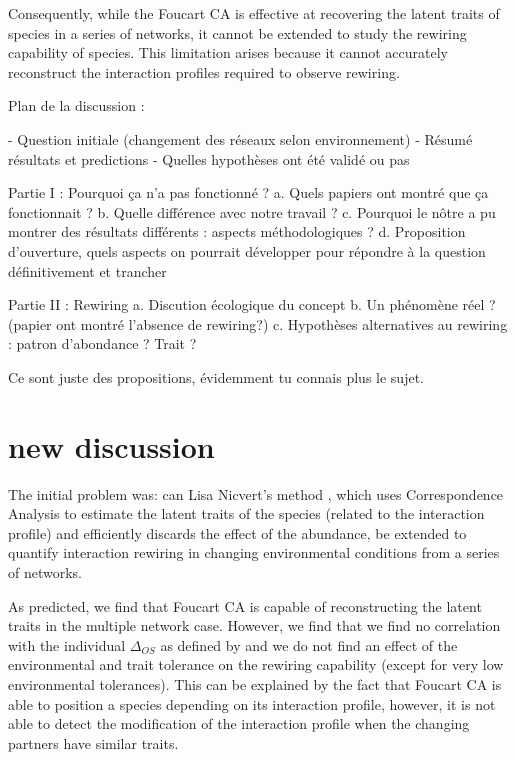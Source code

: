 Consequently, while the Foucart CA is effective at recovering the latent traits of species in a series of networks, it cannot be extended to study the rewiring capability of species. This limitation arises because it cannot accurately reconstruct the interaction profiles required to observe rewiring.






Plan de la discussion : 

- Question initiale (changement des réseaux selon environnement)
- Résumé résultats et predictions
- Quelles hypothèses ont été validé ou pas


Partie I : Pourquoi ça n'a pas fonctionné ?
a. Quels papiers ont montré que ça fonctionnait ?
b. Quelle différence avec notre travail ?
c. Pourquoi le nôtre a pu montrer des résultats différents : aspects méthodologiques ?
d. Proposition d'ouverture, quels aspects on pourrait développer pour répondre à la question définitivement et trancher

Partie II : Rewiring 
a. Discution écologique du concept
b. Un phénomène réel ? (papier ont montré l'absence de rewiring?)
c. Hypothèses alternatives au rewiring : patron d'abondance ? Trait ? 

Ce sont juste des propositions, évidemment tu connais plus le sujet. 

\section{new discussion}

The initial problem was: can Lisa Nicvert's method \citep{these_lisa_2024}, which uses Correspondence Analysis to estimate the latent traits of the species (related to the interaction profile) and efficiently discards the effect of the abundance, be extended to quantify interaction rewiring in changing environmental conditions from a series of networks.

As predicted, we find that Foucart CA is capable of reconstructing the latent traits in the multiple network case. However, we find that we find no correlation with the individual $\Delta_{OS}$ as defined by \cite{toju_interaction_2024} and we do not find an effect of the environmental and trait tolerance on the rewiring capability (except for very low environmental tolerances). 
This can be explained by the fact that Foucart CA is able to position a species depending on its interaction profile, however, it is not able to detect the modification of the interaction profile when the changing partners have similar traits.

